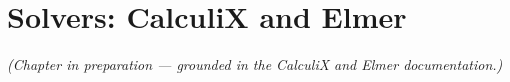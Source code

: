 \chapter{Solvers: CalculiX and Elmer}
\label{ch:solvers}


\emph{(Chapter in preparation --- grounded in the CalculiX and Elmer
documentation.)}
